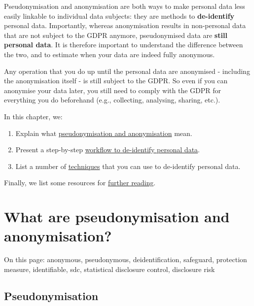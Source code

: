 \documentclass[
]{book}
\providecommand{\tightlist}{%
  \setlength{\itemsep}{0pt}\setlength{\parskip}{0pt}}
\begin{document}
Pseudonymisation and anonymisation are both ways to make personal data less
easily linkable to individual data subjects: they are methods to \textbf{de-identify}
personal data. Importantly, whereas anonymisation results in non-personal data
that are not subject to the GDPR anymore, pseudonymised data are \textbf{still personal
data}. It is therefore important to understand the difference between the two,
and to estimate when your data are indeed fully anonymous.

Any operation that you do up until the personal data are anonymised - including
the anonymisation itself - is still subject to the GDPR. So even if you can
anonymise your data later, you still need to comply with the GDPR for everything
you do beforehand (e.g., collecting, analysing, sharing, etc.).

In this chapter, we:

\begin{enumerate}
\def\labelenumi{\arabic{enumi}.}
\tightlist
\item
  Explain what \protect\hyperlink{definition-anonymisation-pseudonymisation}{pseudonymisation and anonymisation}
  mean.
\item
  Present a step-by-step
  \protect\hyperlink{deidentification-workflow}{workflow to de-identify personal data}.
\item
  List a number of \protect\hyperlink{deidentification-techniques}{techniques} that you can use
  to de-identify personal data.
\end{enumerate}

Finally, we list some resources for \protect\hyperlink{deidentification-resources}{further reading}.

\hypertarget{definition-anonymisation-pseudonymisation}{%
\section{What are pseudonymisation and anonymisation?}\label{definition-anonymisation-pseudonymisation}}

On this page: anonymous, pseudonymous, deidentification, safeguard, protection
measure, identifiable, sdc, statistical disclosure control, disclosure risk

\hypertarget{pseudonymisation}{%
\subsection{Pseudonymisation}\label{pseudonymisation}}
\end{document}
